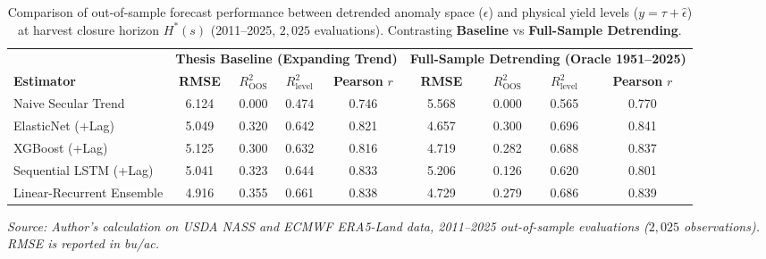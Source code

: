 \begin{table}[htbp]
\centering
\singlespacing
\scriptsize
\setlength{\tabcolsep}{2.5pt}
\renewcommand{\arraystretch}{1.12}
\caption{Comparison of out-of-sample forecast performance between detrended anomaly space ($\epsilon$) and physical yield levels ($y = \tau + \hat{\epsilon}$) at harvest closure horizon $H^*(s)$ (2011--2025, $2{,}025$ evaluations). Contrasting \textbf{Baseline} vs \textbf{Full-Sample Detrending}.}
\label{tab:comp_raw_vs_anomaly_performance}
\begin{tabular*}{\textwidth}{@{\extracolsep{\fill}} l cccc cccc @{}}
\toprule
& \multicolumn{4}{c}{\textbf{Thesis Baseline (Expanding Trend)}} & \multicolumn{4}{c}{\textbf{Full-Sample Detrending (Oracle 1951--2025)}} \\
\cmidrule(lr){2-5}\cmidrule(lr){6-9}
\textbf{Estimator} & \textbf{RMSE} & $R^2_{\text{OOS}}$ & $R^2_{\text{level}}$ & \textbf{Pearson} $r$ & \textbf{RMSE} & $R^2_{\text{OOS}}$ & $R^2_{\text{level}}$ & \textbf{Pearson} $r$ \\
\midrule
Naive Secular Trend          & 6.124 & 0.000 & 0.474 & 0.746 & 5.568 & 0.000 & 0.565 & 0.770 \\
ElasticNet (+Lag)            & 5.049 & 0.320 & 0.642 & 0.821 & 4.657 & 0.300 & 0.696 & 0.841 \\
XGBoost (+Lag)               & 5.125 & 0.300 & 0.632 & 0.816 & 4.719 & 0.282 & 0.688 & 0.837 \\
Sequential LSTM (+Lag)       & 5.041 & 0.323 & 0.644 & 0.833 & 5.206 & 0.126 & 0.620 & 0.801 \\
Linear-Recurrent Ensemble    & 4.916 & 0.355 & 0.661 & 0.838 & 4.729 & 0.279 & 0.686 & 0.839 \\
\bottomrule
\end{tabular*}
\vspace{0.2em}
{\footnotesize \textit{Source: Author's calculation on USDA NASS and ECMWF ERA5-Land data, 2011--2025 out-of-sample evaluations ($2{,}025$ observations). RMSE is reported in bu/ac.}}
\end{table}